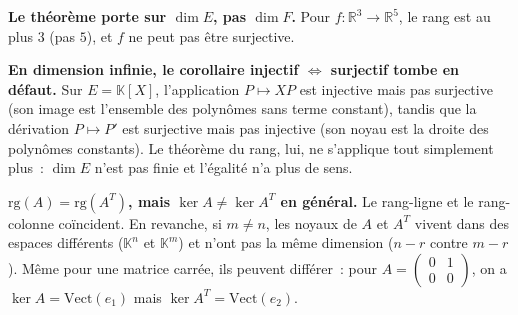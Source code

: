 \vspace{6pt}

\begin{mdframed}[style=cexbar]
  \textbf{Le théorème porte sur $\dim E$, pas $\dim F$.}\enspace%
  Pour $f : \mathbb{R}^3 \to \mathbb{R}^5$, le rang est au plus $3$ (pas $5$),
  et $f$ ne peut pas être surjective.

  \smallskip\noindent
  \textbf{En dimension infinie, le corollaire \og{}injectif $\Leftrightarrow$
  surjectif\fg{} tombe en défaut.}\enspace%
  Sur $E = \mathbb{K}[X]$, l'application $P \mapsto XP$ est injective mais pas
  surjective (son image est l'ensemble des polynômes sans terme constant),
  tandis que la dérivation $P \mapsto P'$ est surjective mais pas injective
  (son noyau est la droite des polynômes constants). Le théorème du rang, lui,
  ne s'applique tout simplement plus~: $\dim E$ n'est pas finie et l'égalité
  n'a plus de sens.

  \smallskip\noindent
  \textbf{$\mathrm{rg}(A) = \mathrm{rg}(A^T)$, mais $\ker A \neq \ker A^T$ en général.}\enspace%
  Le rang-ligne et le rang-colonne coïncident. En revanche, si $m \neq n$, les
  noyaux de $A$ et $A^T$ vivent dans des espaces différents ($\mathbb{K}^n$ et
  $\mathbb{K}^m$) et n'ont pas la même dimension ($n-r$ contre $m-r$).
  Même pour une matrice carrée, ils peuvent différer~: pour
  $A = \begin{pmatrix}0&1\\0&0\end{pmatrix}$, on a
  $\ker A = \mathrm{Vect}(e_1)$ mais $\ker A^T = \mathrm{Vect}(e_2)$.
\end{mdframed}

\vspace{6pt}
\exolabel

